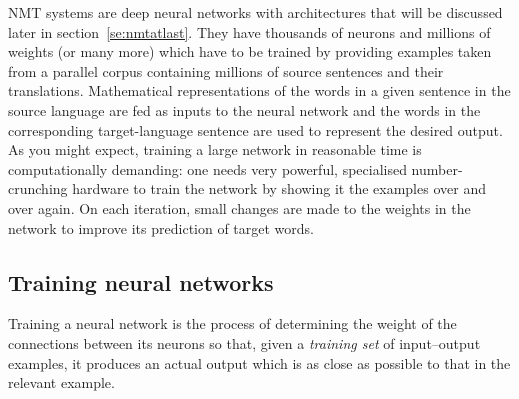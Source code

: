 \documentclass[output=paper,colorlinks,citecolor=brown]{langscibook}
\begin{document}
NMT systems are deep neural networks with architectures that will be discussed later in section~\ref{se:nmtatlast}.
They have thousands of neurons and millions of weights 
(or many more) which have to be trained by providing examples taken from a parallel corpus containing millions of source sentences and their translations. Mathematical representations of the words in a given sentence in the source language are fed as inputs to the neural network and the words in the corresponding target-language sentence are used to represent the desired output. As you might expect, training a large network in reasonable time is computationally demanding: one needs very powerful, specialised number-crunching hardware to train the network by showing it the examples over and over again. On each iteration, small changes are made to the weights in the network to improve its prediction of target words.


\subsection{Training neural networks}\label{sec:perez:3.5}
\label{ss:trainnn}

Training a neural network is the process of determining the weight of the connections between its neurons so that, given a \emph{training set} of input--output examples, it produces an actual output which is as close as possible to that in the relevant example. 
\end{document}
